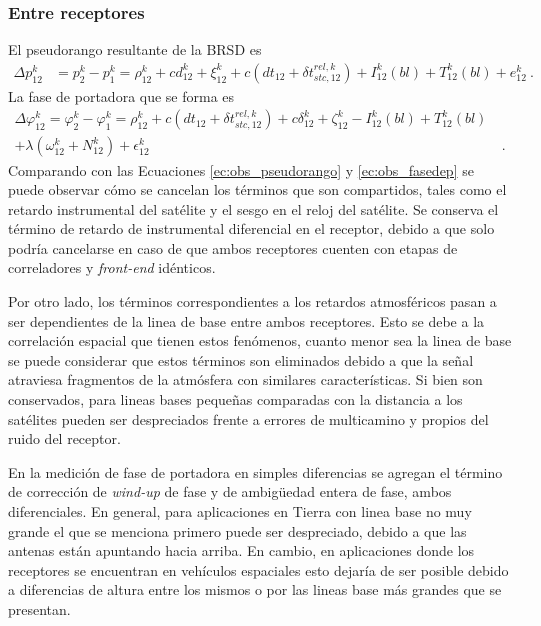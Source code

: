 \documentclass[a4paper,12pt,oneside,onecolumn,final,openright]{book}%
\begin{document}
\subsubsection{Entre receptores}
	El pseudorango resultante de la BRSD es
\begin{align}\label{ec:BRSD_pr}
	\Delta p_{12}^k &= p_2^k - p_1^k = \rho_{12}^k +cd_{12}^k + \xi_{12}^k + c\left( dt_{12} + \delta t_{stc,12}^{rel,k} \right) + I_{12}^k(bl) + T_{12}^k(bl) + e_{12}^k \ .
\end{align}
	La fase de portadora que se forma es
\begin{align}\label{ec:BRSD_fdp}
	\Delta \varphi_{12}^k = \varphi_2^k - \varphi_1^k = \rho_{12}^k + c\left( dt_{12} + \delta t_{stc,12}^{rel,k} \right) + c\delta_{12}^k + \zeta_{12}^k - I_{12}^k(bl) + T_{12}^k(bl) &\\ + \lambda \left( \omega_{12}^k + N_{12}^k \right) + \epsilon_{12}^k & \ . \nonumber
\end{align}
	Comparando con las Ecuaciones \eqref{ec:obs_pseudorango} y \eqref{ec:obs_fasedep} se puede observar cómo se cancelan los términos que son compartidos, tales como el retardo instrumental del satélite y el sesgo en el reloj del satélite. Se conserva el término de retardo de instrumental diferencial en el receptor, debido a que solo podría cancelarse en caso de que ambos receptores cuenten con etapas de correladores y \textit{front-end} idénticos.
	
	 Por otro lado, los términos correspondientes a los retardos atmosféricos pasan a ser dependientes de la linea de base entre ambos receptores. Esto se debe a la correlación espacial que tienen estos fenómenos, cuanto menor sea la linea de base se puede considerar que estos términos son eliminados debido a que la señal atraviesa fragmentos de la atmósfera con similares características. Si bien son conservados, para lineas bases pequeñas comparadas con la distancia a los satélites pueden ser despreciados frente a errores de multicamino y propios del ruido del receptor.
	
	En la medición de fase de portadora en simples diferencias se agregan el término de corrección de \textit{wind-up} de fase y de ambigüedad entera de fase, ambos diferenciales. En general, para aplicaciones en Tierra con linea base no muy grande el que se menciona primero puede ser despreciado, debido a que las antenas están apuntando hacia arriba. En cambio, en aplicaciones donde los receptores se encuentran en vehículos espaciales esto dejaría de ser posible debido a diferencias de altura entre los mismos o por las lineas base más grandes que se presentan.
	
\end{document}
